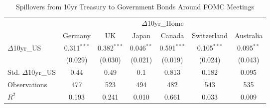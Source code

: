 \begin{table}[!htbp]
\caption{Spillovers from 10yr Treasury to Government Bonds Around FOMC Meetings}
\centering
\begin{tabular}{lcccccc}
\toprule
& \multicolumn{6}{c}{$\Delta$10yr_{Home}} \\
\cmidrule(lr){2-7}
& \multicolumn{1}{c}{Germany} & \multicolumn{1}{c}{UK} & \multicolumn{1}{c}{Japan} & \multicolumn{1}{c}{Canada} & \multicolumn{1}{c}{Switzerland} & \multicolumn{1}{c}{Australia} \\
\midrule
$\Delta$10yr_{US} & 0.311$^{***}$ & 0.382$^{***}$ & 0.046$^{**}$ & 0.591$^{***}$ & 0.105$^{***}$ & 0.095$^{**}$ \\
& (0.029) & (0.030) & (0.021) & (0.019) & (0.024) & (0.043) \\
Std. $\Delta$10yr_{US} & 0.44 & 0.49 & 0.1 & 0.813 & 0.182 & 0.095 \\
\midrule
Observations & 477 & 523 & 494 & 482 & 543 & 535 \\
$R^2$ & 0.193 & 0.241 & 0.010 & 0.661 & 0.033 & 0.009 \\
\bottomrule
\end{tabular}
\label{tab:spillreg}
\end{table}
